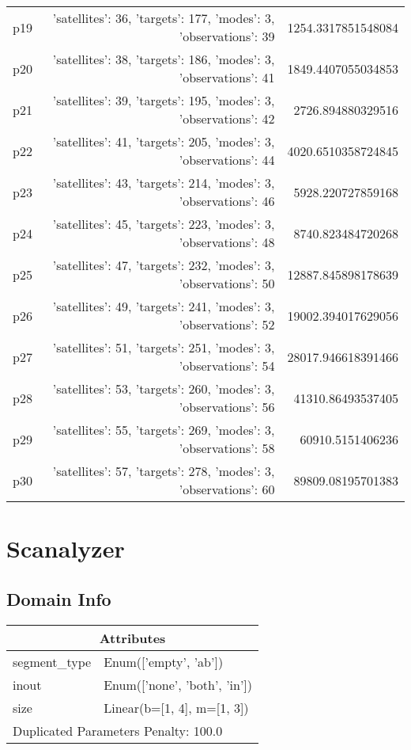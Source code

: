 \documentclass{article}
\begin{document}
\begin{center}
\begin{tabular}{r|r|r}
  p19&{'satellites': 36, 'targets': 177, 'modes': 3, 'observations': 39}&1254.3317851548084\\
  p20&{'satellites': 38, 'targets': 186, 'modes': 3, 'observations': 41}&1849.4407055034853\\
  p21&{'satellites': 39, 'targets': 195, 'modes': 3, 'observations': 42}&2726.894880329516\\
  p22&{'satellites': 41, 'targets': 205, 'modes': 3, 'observations': 44}&4020.6510358724845\\
  p23&{'satellites': 43, 'targets': 214, 'modes': 3, 'observations': 46}&5928.220727859168\\
  p24&{'satellites': 45, 'targets': 223, 'modes': 3, 'observations': 48}&8740.823484720268\\
  p25&{'satellites': 47, 'targets': 232, 'modes': 3, 'observations': 50}&12887.845898178639\\
  p26&{'satellites': 49, 'targets': 241, 'modes': 3, 'observations': 52}&19002.394017629056\\
  p27&{'satellites': 51, 'targets': 251, 'modes': 3, 'observations': 54}&28017.946618391466\\
  p28&{'satellites': 53, 'targets': 260, 'modes': 3, 'observations': 56}&41310.86493537405\\
  p29&{'satellites': 55, 'targets': 269, 'modes': 3, 'observations': 58}&60910.5151406236\\
  p30&{'satellites': 57, 'targets': 278, 'modes': 3, 'observations': 60}&89809.08195701383
                            \end{tabular}
                            \end{center}
                    
                            \newpage \section{Scanalyzer}
                    \subsection*{Domain Info}

                    \begin{center}
                    \begin{tabular}{p{}p{}}
                    \multicolumn{2}{c}{\bf \large Attributes}\\\midrule
                    segment\_type & Enum(['empty', 'ab'])\\
inout & Enum(['none', 'both', 'in'])\\
size & Linear(b=[1, 4], m=[1, 3])
                    
                     \\\midrule
                    \multicolumn{2}{l}{Duplicated Parameters Penalty: 100.0}
                    \end{tabular}
                    \end{center}
                
\end{document}
